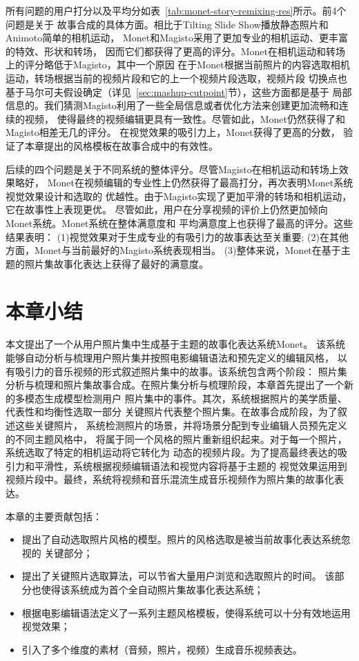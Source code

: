 \documentclass[doctor]{ustcthesis}
\begin{document}
所有问题的用户打分以及平均分如表~\ref{tab:monet-story-remixing-res}所示。前4个问题是关于
故事合成的具体方面。相比于Tilting Slide Show播放静态照片和Animoto简单的相机运动，
Monet和Magisto采用了更加专业的相机运动、更丰富的特效、形状和转场，
因而它们都获得了更高的评分。Monet在相机运动和转场上的评分略低于Magisto，其中一个原因
在于Monet根据当前照片的内容选取相机运动，转场根据当前的视频片段和它的上一个视频片段选取，视频片段
切换点也基于马尔可夫假设确定（详见~\ref{sec:mashup-cutpoint}节），这些方面都是基于
局部信息的。我们猜测Magisto利用了一些全局信息或者优化方法来创建更加流畅和连续的视频，
使得最终的视频编辑更具有一致性。尽管如此，Monet仍然获得了和Magisto相差无几的评分。
在视觉效果的吸引力上，Monet获得了更高的分数，
验证了本章提出的风格模板在故事合成中的有效性。

后续的四个问题是关于不同系统的整体评分。尽管Magisto在相机运动和转场上效果略好，
Monet在视频编辑的专业性上仍然获得了最高打分，再次表明Monet系统视觉效果设计和选取的
优越性。由于Magisto实现了更加平滑的转场和相机运动，它在故事性上表现更优。
尽管如此，用户在分享视频的评价上仍然更加倾向Monet系统。Monet系统在整体满意度和
平均满意度上也获得了最高的评分。这些结果表明：
(1)视觉效果对于生成专业的有吸引力的故事表达至关重要;
(2)在其他方面，Monet与当前最好的Magisto系统表现相当。
(3)整体来说，Monet在基于主题的照片集故事化表达上获得了最好的满意度。

\section{本章小结}
本文提出了一个从用户照片集中生成基于主题的故事化表达系统Monet。
该系统能够自动分析与梳理用户照片集并按照电影编辑语法和预先定义的编辑风格，
以有吸引力的音乐视频的形式叙述照片集中的故事。该系统包含两个阶段：
照片集分析与梳理和照片集故事合成。在照片集分析与梳理阶段，本章首先提出了一个新的多模态生成模型检测用户
照片集中的事件。其次，系统根据照片的美学质量、代表性和均衡性选取一部分
关键照片代表整个照片集。在故事合成阶段，为了叙述这些关键照片，
系统检测照片的场景，并将场景分配到专业编辑人员预先定义的不同主题风格中，
将属于同一个风格的照片重新组织起来。对于每一个照片，系统选取了特定的相机运动将它转化为
动态的视频片段。为了提高最终表达的吸引力和平滑性，系统根据视频编辑语法和视觉内容将基于主题的
视觉效果运用到视频片段中。最终，系统将视频和音乐混流生成音乐视频作为照片集的故事化表达。

本章的主要贡献包括：
\vspace{-0.8em}
\begin{itemize}\setlength{\itemsep}{0pt}
    \item 提出了自动选取照片风格的模型。照片的风格选取是被当前故事化表达系统忽视的
        关键部分；
    \item 提出了关键照片选取算法，可以节省大量用户浏览和选取照片的时间。
        该部分也使得该系统成为首个全自动照片集故事化表达系统；
    \item 根据电影编辑语法定义了一系列主题风格模板，使得系统可以十分有效地运用视觉效果；
    \item 引入了多个维度的素材（音频，照片，视频）生成音乐视频表达。
\end{itemize}
\end{document}
